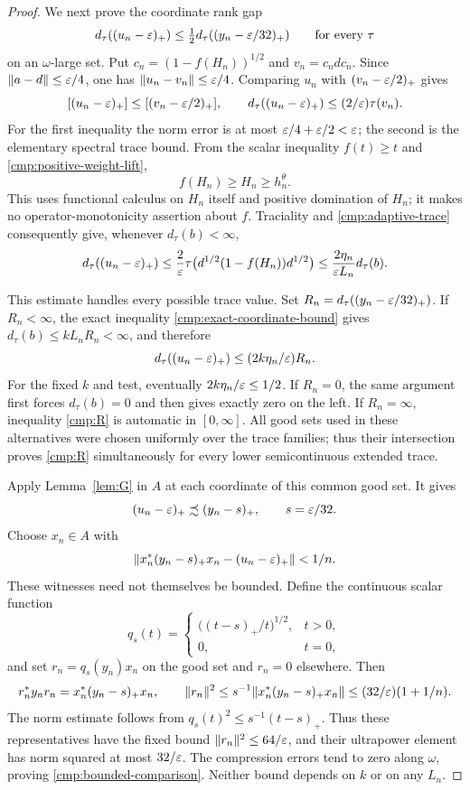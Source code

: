 \begin{proof}
We next prove the coordinate rank gap
\begin{equation}\label{cmp:R}
 d_\tau((u_n-\varepsilon)_+)
       \le\tfrac12 d_\tau((y_n-\varepsilon/32)_+)
       \qquad\text{for every }\tau
\end{equation}
on an $\omega$-large set.  Put
$c_n=(1-f(H_n))^{1/2}$ and $v_n=c_ndc_n$.
Since $\|a-d\|\le\varepsilon/4$, one has
$\|u_n-v_n\|\le\varepsilon/4$.  Comparing $u_n$ with
$(v_n-\varepsilon/2)_+$ gives
\[
 [(u_n-\varepsilon)_+]\le[(v_n-\varepsilon/2)_+],
 \qquad
 d_\tau((u_n-\varepsilon)_+)\le(2/\varepsilon)\tau(v_n).
\]
For the first inequality the norm error is at most
$\varepsilon/4+\varepsilon/2<\varepsilon$; the second is the elementary spectral
trace bound.  From the scalar inequality $f(t)\ge t$ and
\eqref{cmp:positive-weight-lift},
\[
 f(H_n)\ge H_n\ge h_n^\theta.
\]
This uses functional calculus on $H_n$ itself and positive
domination of $H_n$; it makes no operator-monotonicity assertion
about $f$.  Traciality and \eqref{cmp:adaptive-trace} consequently
give, whenever $d_\tau(b)<\infty$,
\begin{equation}\label{cmp:source-rank-estimate}
 d_\tau((u_n-\varepsilon)_+)
 \le\frac{2}{\varepsilon}
     \tau\bigl(d^{1/2}(1-f(H_n))d^{1/2}\bigr)
 \le\frac{2\eta_n}{\varepsilon L_n}d_\tau(b).
\end{equation}

This estimate handles every possible trace value.  Set
$R_n=d_\tau((y_n-\varepsilon/32)_+)$.  If $R_n<\infty$, the exact
inequality \eqref{cmp:exact-coordinate-bound} gives
$d_\tau(b)\le kL_nR_n<\infty$, and therefore
\[
 d_\tau((u_n-\varepsilon)_+)
      \le (2k\eta_n/\varepsilon)R_n.
\]
For the fixed $k$ and test, eventually $2k\eta_n/\varepsilon\le1/2$.
If $R_n=0$, the same argument first forces $d_\tau(b)=0$ and then
gives exactly zero on the left.  If $R_n=\infty$, inequality
\eqref{cmp:R} is automatic in $[0,\infty]$.  All good sets used
in these alternatives were chosen uniformly over the trace
families; thus their intersection proves \eqref{cmp:R}
simultaneously for every lower semicontinuous extended trace.

Apply Lemma~\ref{lem:G} in $A$ at each coordinate of this common
good set.  It gives
\[
 (u_n-\varepsilon)_+\precsim (y_n-s)_+,
 \qquad s=\varepsilon/32.
\]
Choose $x_n\in A$ with
\[
 \|x_n^*(y_n-s)_+x_n-(u_n-\varepsilon)_+\|<1/n.
\]
These witnesses need not themselves be bounded.  Define the
continuous scalar function
\[
 q_s(t)=
 \begin{cases}\bigl((t-s)_+/t\bigr)^{1/2},&t>0,\\0,&t=0,
 \end{cases}
\]
and set $r_n=q_s(y_n)x_n$ on the good set and $r_n=0$ elsewhere.
Then
\[
 r_n^*y_nr_n=x_n^*(y_n-s)_+x_n,
 \qquad
 \|r_n\|^2\le s^{-1}\|x_n^*(y_n-s)_+x_n\|
                 \le(32/\varepsilon)(1+1/n).
\]
The norm estimate follows from $q_s(t)^2\le s^{-1}(t-s)_+$.
Thus these representatives have the fixed bound
$\|r_n\|^2\le64/\varepsilon$, and their ultrapower element has norm
squared at most $32/\varepsilon$.  The compression errors tend to zero
along $\omega$, proving \eqref{cmp:bounded-comparison}.  Neither
bound depends on $k$ or on any $L_n$.
\end{proof}

